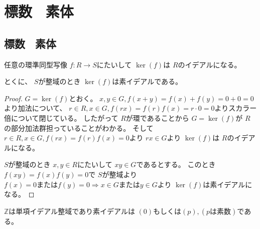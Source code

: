 \documentclass[../master_galois_theory]{subfiles}
\begin{document}
\setcounter{section}{3}

\section{標数 \  素体}

\subsection{標数 \  素体}


\begin{lemm} \label{lemm:kerideal}
  任意の環準同型写像 $f : R \longrightarrow S$にたいして $\ker(f)$は $R$のイデアルになる。

  とくに、 $S$が整域のとき $\ker(f)$は素イデアルである。
\end{lemm}

\begin{proof}
  $G = \ker(f)$とおく。
  $x , y \in G , f(x + y) = f(x) + f(y) = 0 + 0 = 0$より加法について、
  $r \in R , x \in G , f(rx) = f(r)f(x) = r \cdot 0 = 0$よりスカラー倍について閉じている。
  したがって $R$が環であることから $G = \ker(f)$が $R$の部分加法群担っていることがわかる。
  そして $r \in R , x \in G , f(rx) = f(r)f(x) = 0$より $rx \in G$より $\ker(f)$は $R$のイデアルになる。

  $S$が整域のとき $x , y \in R$にたいして $xy \in G$であるとする。
  このとき $f(xy) = f(x)f(y) = 0$で $S$が整域より $f(x) = 0 または f(y) = 0 \Rightarrow x \in G または y \in G$より $\ker(f)$は素イデアルになる。
\end{proof}

\begin{lemm} \label{lemm:Z}
  $\mathbb{Z}$は単項イデアル整域であり素イデアルは $(0) もしくは (p) , (pは素数)$である。
\end{lemm}
\end{document}
